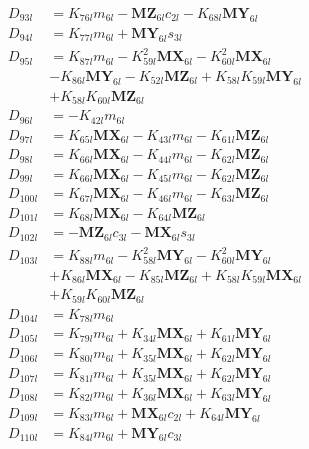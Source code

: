 \begin{align}
D_{93l} &= K_{76l}m_{6l} - \mathbf{MZ}_{6l}c_{2l} - K_{68l}\mathbf{MY}_{6l} \nonumber \\
D_{94l} &= K_{77l}m_{6l} + \mathbf{MY}_{6l}s_{3l} \nonumber \\
D_{95l} &= K_{87l}m_{6l} - K_{59l}^2\mathbf{MX}_{6l} - K_{60l}^2\mathbf{MX}_{6l}  \nonumber \\
&- K_{86l}\mathbf{MY}_{6l} - K_{52l}\mathbf{MZ}_{6l} + K_{58l}K_{59l}\mathbf{MY}_{6l}  \nonumber \\
&+ K_{58l}K_{60l}\mathbf{MZ}_{6l} \nonumber \\
D_{96l} &= -K_{42l}m_{6l} \nonumber \\
D_{97l} &= K_{65l}\mathbf{MX}_{6l} - K_{43l}m_{6l} - K_{61l}\mathbf{MZ}_{6l} \nonumber \\
D_{98l} &= K_{66l}\mathbf{MX}_{6l} - K_{44l}m_{6l} - K_{62l}\mathbf{MZ}_{6l} \nonumber \\
D_{99l} &= K_{66l}\mathbf{MX}_{6l} - K_{45l}m_{6l} - K_{62l}\mathbf{MZ}_{6l} \nonumber \\
D_{100l} &= K_{67l}\mathbf{MX}_{6l} - K_{46l}m_{6l} - K_{63l}\mathbf{MZ}_{6l} \nonumber \\
D_{101l} &= K_{68l}\mathbf{MX}_{6l} - K_{64l}\mathbf{MZ}_{6l} \nonumber \\
D_{102l} &= - \mathbf{MZ}_{6l}c_{3l} - \mathbf{MX}_{6l}s_{3l} \nonumber \\
D_{103l} &= K_{88l}m_{6l} - K_{58l}^2\mathbf{MY}_{6l} - K_{60l}^2\mathbf{MY}_{6l}  \nonumber \\
&+ K_{86l}\mathbf{MX}_{6l} - K_{85l}\mathbf{MZ}_{6l} + K_{58l}K_{59l}\mathbf{MX}_{6l}  \nonumber \\
&+ K_{59l}K_{60l}\mathbf{MZ}_{6l} \nonumber \\
D_{104l} &= K_{78l}m_{6l} \nonumber \\
D_{105l} &= K_{79l}m_{6l} + K_{34l}\mathbf{MX}_{6l} + K_{61l}\mathbf{MY}_{6l} \nonumber \\
D_{106l} &= K_{80l}m_{6l} + K_{35l}\mathbf{MX}_{6l} + K_{62l}\mathbf{MY}_{6l} \nonumber \\
D_{107l} &= K_{81l}m_{6l} + K_{35l}\mathbf{MX}_{6l} + K_{62l}\mathbf{MY}_{6l} \nonumber \\
D_{108l} &= K_{82l}m_{6l} + K_{36l}\mathbf{MX}_{6l} + K_{63l}\mathbf{MY}_{6l} \nonumber \\
D_{109l} &= K_{83l}m_{6l} + \mathbf{MX}_{6l}c_{2l} + K_{64l}\mathbf{MY}_{6l} \nonumber \\
D_{110l} &= K_{84l}m_{6l} + \mathbf{MY}_{6l}c_{3l} \nonumber \\

\end{align}
